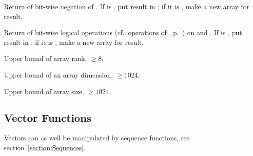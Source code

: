 \begin{LIST}{1cm}
  {
  Return  of bit-wise negation of . If  is \T, put
  result in ; if it is \NIL, make a new array for
  result. 
  }

  {
  Return  of bit-wise logical operations
  (cf.\ operations of , p.\ \pageref{section:Logic Functions}) on
   and  .  If  is \T, put result in
  ; if it is \NIL, make a new array for
  result. 
  }

  {
  Upper bound of array rank, $\geq 8$.
  }

  {
  Upper bound of an array dimension, $\geq 1024$.
  }

  {
  Upper bound of array size, $\geq 1024$.
  }

\end{LIST}


\subsection{Vector Functions} 

Vectors can as well be manipulated by sequence functions, see
section~\ref{section:Sequences}. 

